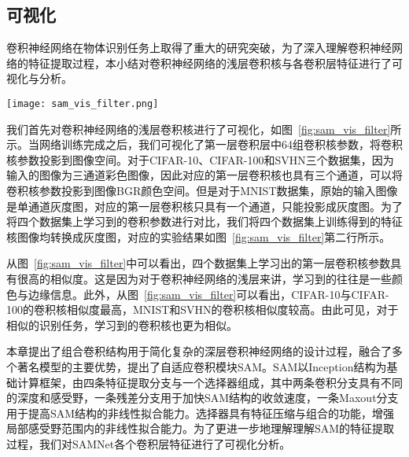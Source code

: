 \subsection{可视化}
\label{sec:sam:vis}

卷积神经网络在物体识别任务上取得了重大的研究突破，为了深入理解卷积神经网络的特征提取过程，本小结对卷积神经网络的浅层卷积核与各卷积层特征进行了可视化与分析。

\begin{figure*}[h]
\centering
\texttt{[image: sam\_vis\_filter.png]}
\caption{第一层卷积核参数可视化。同一个神经网络模型SAMNet，在四个不同的数据集CIFAR-10、CIFAR-100、MNIST和SVHN上训练出的网络模型，第一个卷积层中64组卷积核参数可视化结果。将卷积核参数投影到图像像素空间，对于CIFAR-10、CIFAR-100和SVHN对应投影图像是三维彩色空间，对于MNIST因为输入只有单通道数据，投影后的卷积核可视化图像为灰度图。为了便于四个数据集卷积参数的对比，我们将所有图像转换为灰度图，如图中第二行所示，MNIST参数可视化结果保留不变。因卷积核大小仅仅为 $3\times3$，可视化图像大小也是 $3\times3$ 像素大小的图像，因此视觉效果较为模糊。}
\label{fig:sam_vis_filter}
\end{figure*}

我们首先对卷积神经网络的浅层卷积核进行了可视化，如图~\ref{fig:sam_vis_filter}所示。当网络训练完成之后，我们可视化了第一层卷积层中64组卷积核参数，将卷积核参数投影到图像空间。对于CIFAR-10、CIFAR-100和SVHN三个数据集，因为输入的图像为三通道彩色图像，因此对应的第一层卷积核也具有三个通道，可以将卷积核参数投影到图像BGR颜色空间。但是对于MNIST数据集，原始的输入图像是单通道灰度图，对应的第一层卷积核只具有一个通道，只能投影成灰度图。为了将四个数据集上学习到的卷积参数进行对比，我们将四个数据集上训练得到的特征核图像均转换成灰度图，对应的实验结果如图~\ref{fig:sam_vis_filter}第二行所示。

从图~\ref{fig:sam_vis_filter}中可以看出，四个数据集上学习出的第一层卷积核参数具有很高的相似度。这是因为对于卷积神经网络的浅层来讲，学习到的往往是一些颜色与边缘信息。此外，从图~\ref{fig:sam_vis_filter}可以看出，CIFAR-10与CIFAR-100的卷积核相似度最高，MNIST和SVHN的卷积核相似度较高。由此可见，对于相似的识别任务，学习到的卷积核也更为相似。

本章提出了组合卷积结构用于简化复杂的深层卷积神经网络的设计过程，融合了多个著名模型的主要优势，提出了自适应卷积模块SAM。SAM以Inception结构为基础计算框架，由四条特征提取分支与一个选择器组成，其中两条卷积分支具有不同的深度和感受野，一条残差分支用于加快SAM结构的收敛速度，一条Maxout分支用于提高SAM结构的非线性拟合能力。选择器具有特征压缩与组合的功能，增强局部感受野范围内的非线性拟合能力。为了更进一步地理解理解SAM的特征提取过程，我们对SAMNet各个卷积层特征进行了可视化分析。


